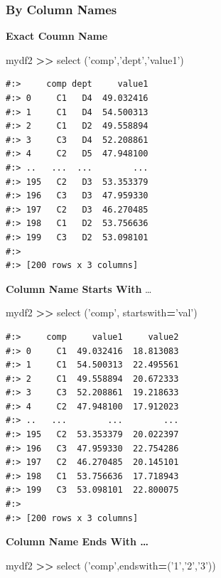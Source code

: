 \documentclass[
]{book}
\newenvironment{Shaded}{\begin{snugshade}}{\end{snugshade}}
\newcommand{\NormalTok}[1]{#1}
\newcommand{\OperatorTok}[1]{\textcolor[rgb]{0.43,0.43,0.43}{\textbf{#1}}}
\newcommand{\StringTok}[1]{\textcolor[rgb]{0.5,0.5,0.5}{#1}}
\begin{document}
\hypertarget{by-column-names}{%
\subsubsection{By Column Names}\label{by-column-names}}

\textbf{Exact Coumn Name}

\begin{Shaded}
\begin{Highlighting}[]
\NormalTok{mydf2 }\OperatorTok{>>}\NormalTok{ select (}\StringTok{'comp'}\NormalTok{,}\StringTok{'dept'}\NormalTok{,}\StringTok{'value1'}\NormalTok{)}
\end{Highlighting}
\end{Shaded}

\begin{verbatim}
#:>     comp dept     value1
#:> 0     C1   D4  49.032416
#:> 1     C1   D4  54.500313
#:> 2     C1   D2  49.558894
#:> 3     C3   D4  52.208861
#:> 4     C2   D5  47.948100
#:> ..   ...  ...        ...
#:> 195   C2   D3  53.353379
#:> 196   C3   D3  47.959330
#:> 197   C2   D3  46.270485
#:> 198   C1   D2  53.756636
#:> 199   C3   D2  53.098101
#:> 
#:> [200 rows x 3 columns]
\end{verbatim}

\textbf{Column Name Starts With} \ldots{}

\begin{Shaded}
\begin{Highlighting}[]
\NormalTok{mydf2 }\OperatorTok{>>}\NormalTok{ select (}\StringTok{'comp'}\NormalTok{, startswith}\OperatorTok{=}\StringTok{'val'}\NormalTok{)}
\end{Highlighting}
\end{Shaded}

\begin{verbatim}
#:>     comp     value1     value2
#:> 0     C1  49.032416  18.813083
#:> 1     C1  54.500313  22.495561
#:> 2     C1  49.558894  20.672333
#:> 3     C3  52.208861  19.218633
#:> 4     C2  47.948100  17.912023
#:> ..   ...        ...        ...
#:> 195   C2  53.353379  20.022397
#:> 196   C3  47.959330  22.754286
#:> 197   C2  46.270485  20.145101
#:> 198   C1  53.756636  17.718943
#:> 199   C3  53.098101  22.800075
#:> 
#:> [200 rows x 3 columns]
\end{verbatim}

\textbf{Column Name Ends With \ldots{}}

\begin{Shaded}
\begin{Highlighting}[]
\NormalTok{mydf2 }\OperatorTok{>>}\NormalTok{ select (}\StringTok{'comp'}\NormalTok{,endswith}\OperatorTok{=}\NormalTok{(}\StringTok{'1'}\NormalTok{,}\StringTok{'2'}\NormalTok{,}\StringTok{'3'}\NormalTok{))}
\end{Highlighting}
\end{Shaded}
\end{document}
